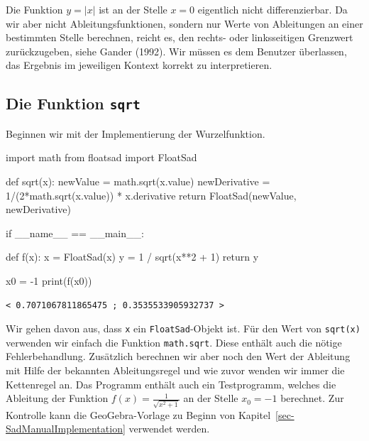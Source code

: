 \documentclass[
  letterpaper,
  DIV=11,
  oneside]{scrreprt}
\newenvironment{Shaded}{\begin{snugshade}}{\end{snugshade}}
\newcommand{\BuiltInTok}[1]{\textcolor[rgb]{0.00,0.23,0.31}{#1}}
\newcommand{\ControlFlowTok}[1]{\textcolor[rgb]{0.00,0.23,0.31}{#1}}
\newcommand{\DecValTok}[1]{\textcolor[rgb]{0.68,0.00,0.00}{#1}}
\newcommand{\ImportTok}[1]{\textcolor[rgb]{0.00,0.46,0.62}{#1}}
\newcommand{\KeywordTok}[1]{\textcolor[rgb]{0.00,0.23,0.31}{#1}}
\newcommand{\NormalTok}[1]{\textcolor[rgb]{0.00,0.23,0.31}{#1}}
\newcommand{\OperatorTok}[1]{\textcolor[rgb]{0.37,0.37,0.37}{#1}}
\newcommand{\StringTok}[1]{\textcolor[rgb]{0.13,0.47,0.30}{#1}}
\newcommand{\VariableTok}[1]{\textcolor[rgb]{0.07,0.07,0.07}{#1}}
\theoremstyle{definition}
\theoremstyle{definition}
\theoremstyle{remark}
\begin{document}
Die Funktion \(y=|x|\) ist an der Stelle \(x=0\) eigentlich nicht
differenzierbar. Da wir aber nicht Ableitungsfunktionen, sondern nur
Werte von Ableitungen an einer bestimmten Stelle berechnen, reicht es,
den rechts- oder linksseitigen Grenzwert zurückzugeben, siehe Gander
(1992). Wir müssen es dem Benutzer überlassen, das Ergebnis im
jeweiligen Kontext korrekt zu interpretieren.

\hypertarget{die-funktion-sqrt}{%
\subsection{\texorpdfstring{Die Funktion
\texttt{sqrt}}{Die Funktion sqrt}}\label{die-funktion-sqrt}}

Beginnen wir mit der Implementierung der Wurzelfunktion.

\begin{Shaded}
\begin{Highlighting}[]
\ImportTok{import}\NormalTok{ math}
\ImportTok{from}\NormalTok{ floatsad }\ImportTok{import}\NormalTok{ FloatSad}

\KeywordTok{def}\NormalTok{ sqrt(x):}
\NormalTok{    newValue }\OperatorTok{=}\NormalTok{ math.sqrt(x.value)}
\NormalTok{    newDerivative }\OperatorTok{=} \DecValTok{1}\OperatorTok{/}\NormalTok{(}\DecValTok{2}\OperatorTok{*}\NormalTok{math.sqrt(x.value)) }\OperatorTok{*}\NormalTok{ x.derivative}
    \ControlFlowTok{return}\NormalTok{ FloatSad(newValue, newDerivative)}

\ControlFlowTok{if} \VariableTok{\_\_name\_\_} \OperatorTok{==} \StringTok{\textquotesingle{}\_\_main\_\_\textquotesingle{}}\NormalTok{:}

    \KeywordTok{def}\NormalTok{ f(x):}
\NormalTok{        x }\OperatorTok{=}\NormalTok{ FloatSad(x)}
\NormalTok{        y }\OperatorTok{=} \DecValTok{1} \OperatorTok{/}\NormalTok{ sqrt(x}\OperatorTok{**}\DecValTok{2} \OperatorTok{+} \DecValTok{1}\NormalTok{)}
        \ControlFlowTok{return}\NormalTok{ y}

\NormalTok{    x0 }\OperatorTok{=} \OperatorTok{{-}}\DecValTok{1}
    \BuiltInTok{print}\NormalTok{(f(x0))}
\end{Highlighting}
\end{Shaded}

\begin{verbatim}
< 0.7071067811865475 ; 0.3535533905932737 >
\end{verbatim}

Wir gehen davon aus, dass \texttt{x} ein \texttt{FloatSad}-Objekt ist.
Für den Wert von \texttt{sqrt(x)} verwenden wir einfach die Funktion
\texttt{math.sqrt}. Diese enthält auch die nötige Fehlerbehandlung.
Zusätzlich berechnen wir aber noch den Wert der Ableitung mit Hilfe der
bekannten Ableitungsregel und wie zuvor wenden wir immer die Kettenregel
an. Das Programm enthält auch ein Testprogramm, welches die Ableitung
der Funktion \(f(x) = \frac{1}{\sqrt{x^2+1}}\) an der Stelle
\(x_0 = -1\) berechnet. Zur Kontrolle kann die GeoGebra-Vorlage zu
Beginn von Kapitel~\ref{sec-SadManualImplementation} verwendet werden.
\end{document}
